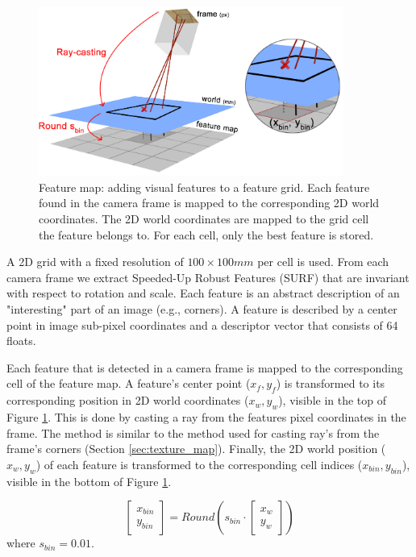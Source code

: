 \begin{figure}[htb]
\centering
\includegraphics[width=10cm]{images/mapping3.png}
\caption{Feature map: adding visual features to a feature grid. Each feature found in the camera frame is mapped to the corresponding 2D world coordinates. The 2D world coordinates are mapped to the grid cell the feature belongs to. For each cell, only the best feature is stored.}
\label{fig:mapping3}
\end{figure}

A 2D grid with a fixed resolution of $100 \times 100mm$ per cell is used.
From each camera frame we extract Speeded-Up Robust Features (SURF) \cite{Bay2008cviu} that are invariant with respect to rotation and scale.
Each feature is an abstract description of an "interesting" part of an image (e.g., corners).
A feature is described by a center point in image sub-pixel coordinates and a descriptor vector that consists of 64 floats.

Each feature that is detected in a camera frame is mapped to the corresponding cell of the feature map.
A feature's center point ($x_f, y_f$) is transformed to its corresponding position in 2D world coordinates ($x_w, y_w$), visible in the top of Figure \ref{fig:mapping3}.
This is done by casting a ray from the features pixel coordinates in the frame.
The method is similar to the method used for casting ray's from the frame's corners (Section \ref{sec:texture_map}).
Finally, the 2D world position ($x_w, y_w$) of each feature is transformed to the corresponding cell indices ($x_{bin}, y_{bin}$), visible in the bottom of Figure \ref{fig:mapping3}.

\begin{equation}
\left[ {
\begin{array}{c} x_{bin} \\ y_{bin} \end{array}
} \right]
=
Round(
s_{bin}
\cdot
\left[ {
\begin{array}{c} x_{w} \\ y_{w} \end{array}
} \right]
)
\end{equation}
where $s_{bin} = 0.01$.

